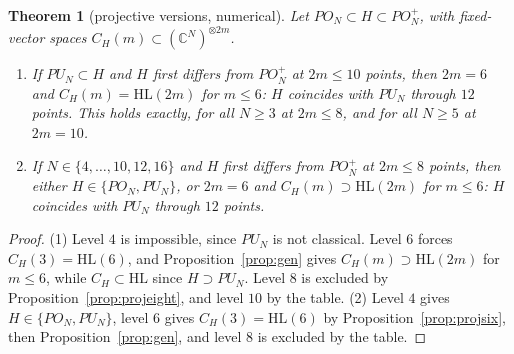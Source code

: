 \documentclass[11pt]{amsart}
\newtheorem{theorem}{Theorem}[section]
\theoremstyle{definition}
\theoremstyle{remark}
\theoremstyle{plain}
\numberwithin{equation}{section}
\numberwithin{table}{section}
\newcommand{\C}{\mathbb C}
\newcommand{\HL}{\mathrm{HL}}
\begin{document}
\begin{theorem}[projective versions, numerical]\label{thm:projective}
Let $PO_N\subset H\subset PO_N^+$, with fixed-vector spaces $C_H(m)\subset(\C^N)^{\otimes 2m}$.
\begin{enumerate}
\item If $PU_N\subset H$ and $H$ first differs from $PO_N^+$ at $2m\le10$ points, then $2m=6$ and $C_H(m)=\HL(2m)$ for $m\le6$: $H$ coincides with $PU_N$ through $12$ points. This holds exactly, for all $N\ge3$ at $2m\le8$, and for all $N\ge5$ at $2m=10$.
\item If $N\in\{4,\dots,10,12,16\}$ and $H$ first differs from $PO_N^+$ at $2m\le8$ points, then either $H\in\{PO_N,PU_N\}$, or $2m=6$ and $C_H(m)\supset\HL(2m)$ for $m\le6$: $H$ coincides with $PU_N$ through $12$ points.
\end{enumerate}
\end{theorem}
\begin{proof}
(1) Level $4$ is impossible, since $PU_N$ is not classical. Level $6$ forces $C_H(3)=\HL(6)$, and Proposition~\ref{prop:gen} gives $C_H(m)\supset\HL(2m)$ for $m\le6$, while $C_H\subset\HL$ since $H\supset PU_N$. Level $8$ is excluded by Proposition~\ref{prop:projeight}, and level $10$ by the table. (2) Level $4$ gives $H\in\{PO_N,PU_N\}$, level $6$ gives $C_H(3)=\HL(6)$ by Proposition~\ref{prop:projsix}, then Proposition~\ref{prop:gen}, and level $8$ is excluded by the table.
\end{proof}
\end{document}
